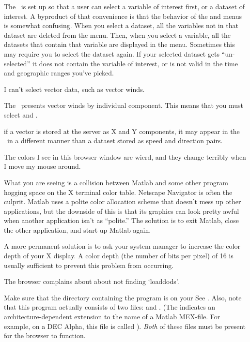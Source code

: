 \fix  The \GUI\ is set up so that a user can select a variable of
interest first, or a dataset of interest.  A byproduct of that
convenience is that the behavior of the  and
 menus is somewhat confusing.  When you select a
dataset, all the variables not in that dataset are deleted from the
 menu.  Then, when you select a variable, all the
datasets that contain that variable are displayed in the
 menu.  Sometimes this may require you to select the
dataset again.  If your selected dataset gets ``un-selected'' it does
not contain the variable of interest, or is not valid in the time and
geographic ranges you've picked.

\problem  I can't select vector data, such as vector winds.

\fix  The \GUI\ presents vector winds by individual component.  This
means that you must select  and .


if a vector is stored at the server as X and Y components,
it may appear in the \GUI\ in a different manner than a dataset stored
as speed and direction pairs.

\problem  The colors I see in this browser window are wierd, and they
change terribly when I move my mouse around.

\fix What you are seeing is a collision between Matlab and some other
program hogging space on the X terminal color table. Netscape
Navigator is often the culprit. Matlab uses a polite color allocation
scheme that doesn't mess up other applications, but the downside of
this is that its graphics can look pretty awful when another
application isn't as ``polite.'' The solution is to exit Matlab, close
the other application, and start up Matlab again.

A more permanent solution is to ask your system manager to increase
the color depth of your X display.  A color depth (the number of bits
per pixel) of 16 is usually sufficient to prevent this problem from
occurring. 

\problem The browser complains about about not finding `loaddods'.

\fix Make sure that the directory containing the 
program is on your  See . 
Also, note that this program actually consists of two files:
 and . (The \lit{***} indicates an
architecture-dependent extension to the name of a Matlab MEX-file. For
example, on a DEC Alpha, this file is called
). \emph{Both} of these files must be present for
the browser to function.

